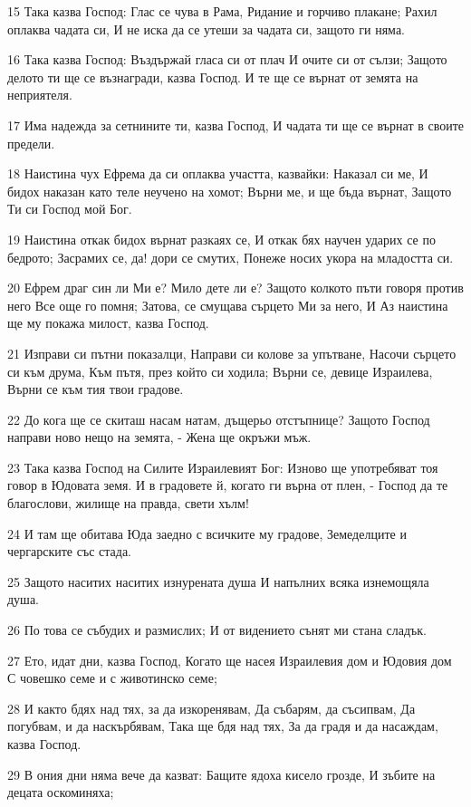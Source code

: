 \par 15 Така казва Господ: Глас се чува в Рама, Ридание и горчиво плакане; Рахил оплаква чадата си, И не иска да се утеши за чадата си, защото ги няма.
\par 16 Така казва Господ: Въздържай гласа си от плач И очите си от сълзи; Защото делото ти ще се възнагради, казва Господ. И те ще се върнат от земята на неприятеля.
\par 17 Има надежда за сетнините ти, казва Господ, И чадата ти ще се върнат в своите предели.
\par 18 Наистина чух Ефрема да си оплаква участта, казвайки: Наказал си ме, И бидох наказан като теле неучено на хомот; Върни ме, и ще бъда върнат, Защото Ти си Господ мой Бог.
\par 19 Наистина откак бидох върнат разкаях се, И откак бях научен ударих се по бедрото; Засрамих се, да! дори се смутих, Понеже носих укора на младостта си.
\par 20 Ефрем драг син ли Ми е? Мило дете ли е? Защото колкото пъти говоря против него Все още го помня; Затова, се смущава сърцето Ми за него, И Аз наистина ще му покажа милост, казва Господ.
\par 21 Изправи си пътни показалци, Направи си колове за упътване, Насочи сърцето си към друма, Към пътя, през който си ходила; Върни се, девице Израилева, Върни се към тия твои градове.
\par 22 До кога ще се скиташ насам натам, дъщерьо отстъпнице? Защото Господ направи ново нещо на земята, - Жена ще окръжи мъж.
\par 23 Така казва Господ на Силите Израилевият Бог: Изново ще употребяват тоя говор в Юдовата земя. И в градовете й, когато ги върна от плен, - Господ да те благослови, жилище на правда, свети хълм!
\par 24 И там ще обитава Юда заедно с всичките му градове, Земеделците и чергарските със стада.
\par 25 Защото наситих наситих изнурената душа И напълних всяка изнемощяла душа.
\par 26 По това се събудих и размислих; И от видението сънят ми стана сладък.
\par 27 Ето, идат дни, казва Господ, Когато ще насея Израилевия дом и Юдовия дом С човешко семе и с животинско семе;
\par 28 И както бдях над тях, за да изкоренявам, Да събарям, да съсипвам, Да погубвам, и да наскърбявам, Така ще бдя над тях, За да градя и да насаждам, казва Господ.
\par 29 В ония дни няма вече да казват: Бащите ядоха кисело грозде, И зъбите на децата оскоминяха;
